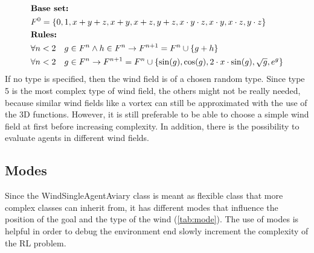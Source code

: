 \newpage
\begin{align}
	&\textbf{Base set:} \notag \\
	&F^0 = \{0, 1, x + y + z, x + y, x + z, y + z, 
	x \cdot y \cdot z, x \cdot y, x \cdot z, y \cdot z\} \label{eq:base}\\
	&\textbf{Rules:} \notag \\
	&\forall n < 2 \quad g \in F^n \land h \in F^n \rightarrow F^{n+1} = F^n \cup \{ 
	 g + h\} \label{eq:rule0}\\
	&\forall n < 2 \quad g \in F^n \rightarrow F^{n+1} = F^n \cup \{ \sin(g), \cos(g), 2 \cdot x \cdot \sin(g), \sqrt{g}, e^g\} \label{eq:rule1}
\end{align}
\newline
If no type is specified, then the wind field is of a chosen random type.
Since type 5 is the most complex type of wind field, the others might not be really needed, because similar wind fields like a vortex can still be approximated with the use of the 3D functions. However, it is still preferable to be able to choose a simple wind field at first before increasing complexity. In addition, there is the possibility to evaluate agents in different wind fields.

\subsection{Modes}\label{sec:modes}
Since the WindSingleAgentAviary class is meant as flexible class that more complex classes can inherit from, it has different modes that influence the position of the goal and the type of the wind (\cref{tab:mode}).
The use of modes is helpful in order to debug the environment end slowly increment the complexity of the RL problem.

